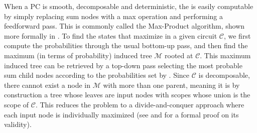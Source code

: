 When a PC is smooth, decomposable and deterministic, the \map{} is easily computable by simply
replacing sum nodes with a max operation and performing a feedforward \evi{} pass. This is commonly
called the Max-Product algorithm, shown more formally in . To find the states that
maximize  in a given circuit $\mathcal{C}$, we first compute the \map{} probabilities
through the usual bottom-up pass, and then find the maximum (in terms of probability) induced tree
$\mathcal{M}$ rooted at $\mathcal{C}$. This maximum induced tree can be retrieved by a top-down
pass selecting the most probable sum child nodes according to the probabilities set by \map{}.
Since $\mathcal{C}$ is decomposable, there cannot exist a node in $\mathcal{M}$ with more than one
parent, meaning it is by construction a tree whose leaves are input nodes with scopes whose union
is the scope of $\mathcal{C}$. This reduces the problem to a divide-and-conquer approach where each
input node is individually maximized (see  and  for a formal
proof on its validity).

